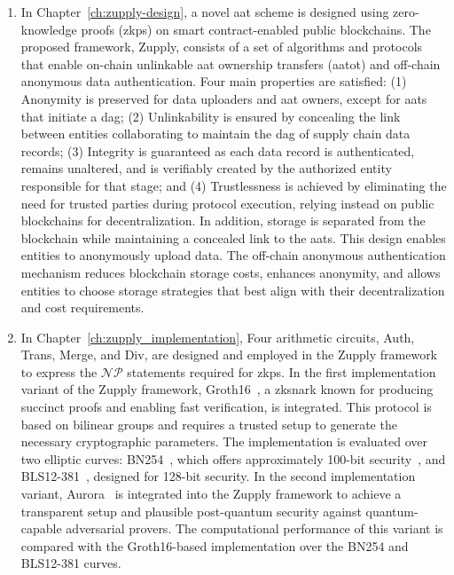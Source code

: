 \begin{enumerate}
\item  In Chapter~\ref{ch:zupply-design}, a novel \gls{aat} scheme is designed using zero-knowledge proofs (\glspl{zkp}) on smart contract-enabled public blockchains. The proposed framework, Zupply, consists of a set of algorithms and protocols that enable on-chain unlinkable \gls{aat} ownership transfers (\gls{aatot}) and off-chain anonymous data authentication. Four main properties are satisfied: (1) Anonymity is preserved for data uploaders and \gls{aat} owners, except for \glspl{aat} that initiate a \gls{dag}; (2) Unlinkability is ensured by concealing the link between entities collaborating to maintain the \gls{dag} of supply chain data records; (3) Integrity is guaranteed as each data record is authenticated, remains unaltered, and is verifiably created by the authorized entity responsible for that stage; and (4) Trustlessness is achieved by eliminating the need for trusted parties during protocol execution, relying instead on public blockchains for decentralization. In addition, storage is separated from the blockchain while maintaining a concealed link to the \glspl{aat}. This design enables entities to anonymously upload data. The off-chain anonymous authentication mechanism reduces blockchain storage costs, enhances anonymity, and allows entities to choose storage strategies that best align with their decentralization and cost requirements.

\item In Chapter~\ref{ch:zupply_implementation}, Four arithmetic circuits, \textsf{Auth}, \textsf{Trans}, \textsf{Merge}, and \textsf{Div}, are designed and employed in the Zupply framework to express the $\mathcal{NP}$ statements required for \glspl{zkp}. In the first implementation variant of the Zupply framework, Groth16~\cite{Groth2016}, a \gls{zksnark} known for producing succinct proofs and enabling fast verification, is integrated. This protocol is based on bilinear groups and requires a trusted setup to generate the necessary cryptographic parameters. The implementation is evaluated over two elliptic curves: BN254~\cite{BNcurve}, which offers approximately 100-bit security~\cite{Barbulescu2019}, and BLS12-381~\cite{BLS_curve2003}, designed for 128-bit security. In the second implementation variant, Aurora~\cite{Aurora2019} is integrated into the Zupply framework to achieve a transparent setup and plausible post-quantum security against quantum-capable adversarial provers. The computational performance of this variant is compared with the Groth16-based implementation over the BN254 and BLS12-381 curves.

\end{enumerate}

    